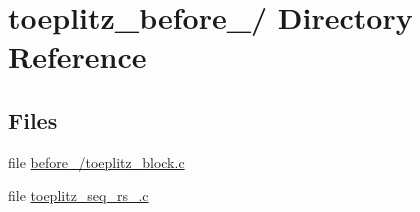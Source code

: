 \section{toeplitz\-\_\-before\-\_/ Directory Reference}
\label{dir_5f072d072c5e8f3d3469934807a839e1}
\subsection*{Files}
\begin{DoxyCompactItemize}
\item 
file \hyperlink{before__20121123_2toeplitz__block_8c}{before\-\_/toeplitz\-\_\-block.\-c}
\item 
file \hyperlink{toeplitz__seq__rs__20121003_8c}{toeplitz\-\_\-seq\-\_\-rs\-\_.\-c}
\end{DoxyCompactItemize}
